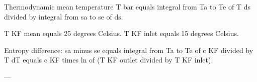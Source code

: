 Thermodynamic mean temperature T bar equals integral from Ta to Te of T ds divided by integral from sa to se of ds.  

T KF mean equals 25 degrees Celsius.  
T KF inlet equals 15 degrees Celsius.  

Entropy difference:  
sa minus se equals integral from Ta to Te of c KF divided by T dT equals c KF times ln of (T KF outlet divided by T KF inlet).  

---